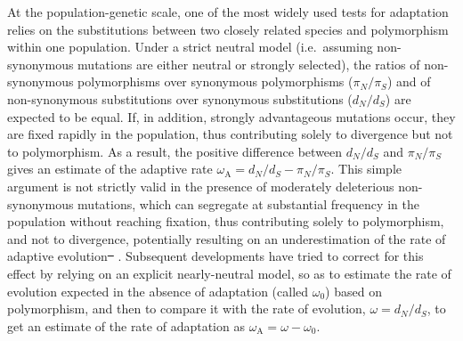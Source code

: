 \documentclass{article}
\newcommand{\dn}{d_N}
\newcommand{\ds}{d_S}
\newcommand{\dnds}{\dn / \ds}
\newcommand{\rateApop}{\omega_{\mathrm{A}}}
\newcommand{\pn}{\pi_N}
\newcommand{\ps}{\pi_S}
\newcommand{\pnps}{\pn / \ps}
\providecommand{\DIFaddtex}[1]{{\protect\color{blue}\uwave{#1}}} %
\providecommand{\DIFdeltex}[1]{{\protect\color{red}\sout{#1}}}                      %
\providecommand{\DIFaddbegin}{} %
\providecommand{\DIFaddend}{} %
\providecommand{\DIFdelbegin}{} %
\providecommand{\DIFdelend}{} %
\providecommand{\DIFadd}[1]{\texorpdfstring{\DIFaddtex{#1}}{#1}} %
\providecommand{\DIFdel}[1]{\texorpdfstring{\DIFdeltex{#1}}{}} %
\newcommand{\DIFscaledelfig}{0.5}
\newlength{\DIFdelgraphicswidth} %
\newlength{\DIFdelgraphicsheight} %
\newcommand{\DIFaddincludegraphics}[2][]{{\color{blue}\fbox{\DIFOincludegraphics[#1]{#2}}}} %
\newcommand{\DIFdelincludegraphics}[2][]{%
\sbox{\DIFdelgraphicsbox}{\DIFOincludegraphics[#1]{#2}}%
\settoboxwidth{\DIFdelgraphicswidth}{\DIFdelgraphicsbox} %
\settoboxtotalheight{\DIFdelgraphicsheight}{\DIFdelgraphicsbox} %
\scalebox{\DIFscaledelfig}{%
\parbox[b]{\DIFdelgraphicswidth}{\usebox{\DIFdelgraphicsbox}\\[-\baselineskip] \rule{\DIFdelgraphicswidth}{0em}}\llap{\resizebox{\DIFdelgraphicswidth}{\DIFdelgraphicsheight}{%
\setlength{\unitlength}{\DIFdelgraphicswidth}%
\begin{picture}(1,1)%
\thicklines\linethickness{2pt} %
{\color[rgb]{1,0,0}\put(0,0){\framebox(1,1){}}}%
{\color[rgb]{1,0,0}\put(0,0){\line( 1,1){1}}}%
{\color[rgb]{1,0,0}\put(0,1){\line(1,-1){1}}}%
\end{picture}%
}\hspace*{3pt}}} %
} %
\DeclareRobustCommand{\DIFaddbegin}{\DIFOaddbegin \let\includegraphics\DIFaddincludegraphics} %
\DeclareRobustCommand{\DIFaddend}{\DIFOaddend \let\includegraphics\DIFOincludegraphics} %
\DeclareRobustCommand{\DIFdelbegin}{\DIFOdelbegin \let\includegraphics\DIFdelincludegraphics} %
\DeclareRobustCommand{\DIFdelend}{\DIFOaddend \let\includegraphics\DIFOincludegraphics} %
\begin{document}
    At the population-genetic scale, one of the most widely used tests for adaptation relies on the substitutions between two closely related species and polymorphism within one population\cite{mcdonald_adaptative_1991}.
    Under a strict neutral model (i.e.~assuming non-synonymous mutations are either neutral or strongly selected), the ratios of non-synonymous polymorphisms over synonymous polymorphisms ($\pnps$) and of non-synonymous substitutions over synonymous substitutions ($\dnds$) are expected to be equal.
    If, in addition, strongly advantageous mutations occur, they are fixed rapidly in the population, thus contributing solely to divergence but not to polymorphism.
    As a result, the positive difference between $\dnds$ and $\pnps$ gives an estimate of the adaptive rate $\rateApop = \dnds-\pnps$\cite{smith_adaptive_2002}.
    This simple argument is not strictly valid in the presence of moderately deleterious non-synonymous mutations, which can segregate at substantial frequency in the population without reaching fixation, thus contributing solely to polymorphism, and not to divergence, potentially resulting on an underestimation of the rate of adaptive evolution\DIFdelbegin \DIFdel{\mbox{%
\cite{eyre-walker_quantifying_2002}}\hspace{0pt}%
}\DIFdelend \DIFaddbegin \DIFadd{\mbox{%
\cite{mcdonald_adaptative_1991, eyre-walker_quantifying_2002}}\hspace{0pt}%
}\DIFaddend .
    Subsequent developments have tried to correct for this effect by relying on an explicit nearly-neutral model\cite{eyre-walker_estimating_2009, galtier_adaptive_2016}, so as to estimate the rate of evolution expected in the absence of adaptation (called $\omega_0$) based on polymorphism, and then to compare it with the rate of evolution, $\omega=\dnds$, to get an estimate of the rate of adaptation as $\rateApop = \omega-\omega_0$.
\end{document}
